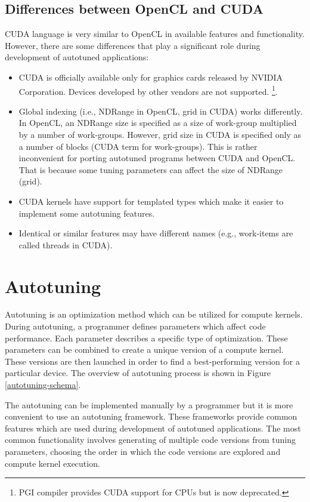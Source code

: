 \documentclass[
  digital,     %
  oneside,     %
  nosansbold,  %
  nocolorbold, %
  lof,         %
  lot,         %
  nocover
]{fithesis4}
\begin{document}
\subsection{Differences between OpenCL and CUDA}
CUDA language is very similar to OpenCL in available features and functionality. However, there are some differences that play a significant role during development of autotuned applications:
\begin{itemize}
	\item CUDA is officially available only for graphics cards released by NVIDIA Corporation. Devices developed by other vendors are not supported. \footnote{PGI compiler provides CUDA support for CPUs but is now deprecated.}.
	\item Global indexing (i.e., NDRange in OpenCL, grid in CUDA) works differently. In OpenCL, an NDRange size is specified as a size of work-group multiplied by a number of work-groups. However, grid size in CUDA is specified only as a number of blocks (CUDA term for work-groups). This is rather inconvenient for porting autotuned programs between CUDA and OpenCL. That is because some tuning parameters can affect the size of NDRange (grid).
	\item CUDA kernels have support for templated types which make it easier to implement some autotuning features.
	\item Identical or similar features may have different names (e.g., work-items are called threads in CUDA).
\end{itemize}

\section{Autotuning}
Autotuning is an optimization method which can be utilized for compute kernels. During autotuning, a programmer defines parameters which affect code performance. Each parameter describes a specific type of optimization. These parameters can be combined to create a unique version of a compute kernel. These versions are then launched in order to find a best-performing version for a particular device. The overview of autotuning process is shown in Figure \ref{autotuning-schema}.

The autotuning can be implemented manually by a programmer but it is more convenient to use an autotuning framework. These frameworks provide common features which are used during development of autotuned applications. The most common functionality involves generating of multiple code versions from tuning parameters, choosing the order in which the code versions are explored and compute kernel execution.
\end{document}
